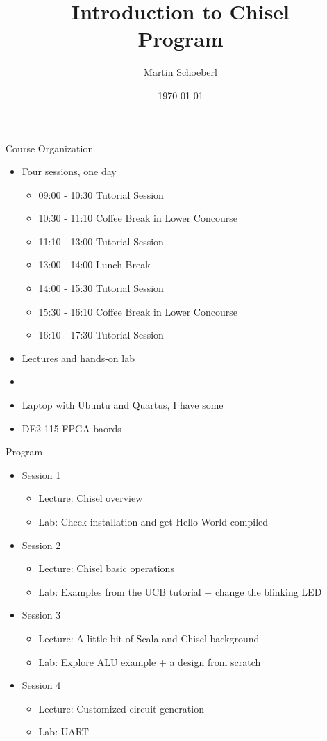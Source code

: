 \documentclass[xcolor=pdflatex,dvipsnames,table]{beamer}
\title{Introduction to Chisel\\Program}
\author{Martin Schoeberl}
\date{\today}
\institute{Technical University of Denmark}
\begin{document}
\begin{frame}
\titlepage
\end{frame}


\begin{frame}[fragile]{Course Organization}
\begin{itemize}
\item Four sessions, one day
\begin{itemize}
\item	09:00 - 10:30	Tutorial Session
\item	10:30 - 11:10	Coffee Break in Lower Concourse
\item	11:10 - 13:00	Tutorial Session
\item	13:00 - 14:00	Lunch Break
\item	14:00 - 15:30	Tutorial Session
\item	15:30 - 16:10	Coffee Break in Lower Concourse
\item	16:10 - 17:30	Tutorial Session
\end{itemize}
\item Lectures and hands-on lab
\item 
\item Laptop with Ubuntu and Quartus, I have some
\item DE2-115 FPGA baords
\end{itemize}
\end{frame}

\begin{frame}[fragile]{Program}
\begin{itemize}
\item Session 1
\begin{itemize}
\item Lecture: Chisel overview
\item Lab: Check installation and get Hello World compiled
\end{itemize}
\item Session 2
\begin{itemize}
\item Lecture: Chisel basic operations
\item Lab: Examples from the UCB tutorial + change the blinking LED
\end{itemize}
\item Session 3
\begin{itemize}
\item Lecture: A little bit of Scala and Chisel background 
\item Lab: Explore ALU example + a design from scratch
\end{itemize}
\item Session 4
\begin{itemize}
\item Lecture: Customized circuit generation
\item Lab: UART
\end{itemize}
\end{itemize}
\end{frame}
\end{document}
